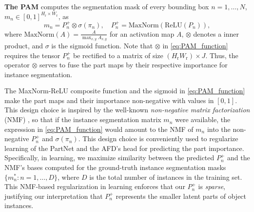 \documentclass[final]{cvpr}
\begin{document}
\textbf{The PAM} computes the segmentation mask of every bounding box $n=1,\dots,N$, $m_n\in[0,1]^{H_{\text{r}}\times W_{\text{r}}}$, as%
%
\begin{equation}
    m_n =  P_n^+ \otimes \sigma (\pi_n),\quad
    P_n^+ =\text{MaxNorm}(\text{ReLU} (P_n)),
    \label{eq:PAM_function}
\end{equation} 
%
where $\text{MaxNorm} (A) {=} \frac{A}{\max_{x,y} A_{x,y}}$ for an activation map $A$,
 $\otimes$ denotes a inner product, and $\sigma$ is the sigmoid  function. 
 Note that  $\otimes$ in \eqref{eq:PAM_function} requires the tensor $P_n^+$  be rectified to a matrix of size $(H_{\text{r}} W_{\text{r}})\times J$. Thus,  the operator  $\otimes$ serves to fuse the part  maps by their respective importance for instance segmentation.

The  MaxNorm-ReLU  composite function and the sigmoid in \eqref{eq:PAM_function} make the part maps and their importance non-negative with values in $[0,1]$. This design choice is inspired by the well-known {\em non-negative matrix factorization} (NMF) \cite{lee1999learning}, so that if the instance segmentation matrix $m_n$ were available, the expression in \eqref{eq:PAM_function} would amount to the NMF of $m_n$ into the non-negative $P_n^+$ and $\sigma (\pi_n)$. This design choice is conveniently used to  regularize learning of the PartNet and the AFD's head for predicting the  part importance. Specifically, in learning, we maximize similarity between the predicted $P_n^+$ and the NMF's bases computed for the  ground-truth instance segmentation masks $\{m_n^*:n=1,\dots, D\}$, where $D$ is the total number of instances in the training set. This NMF-based regularization in learning enforces that our $P_n^+$ is {\em sparse}, justifying our interpretation that $P_n^+$ represents the smaller latent parts of object instances. 


\end{document}
